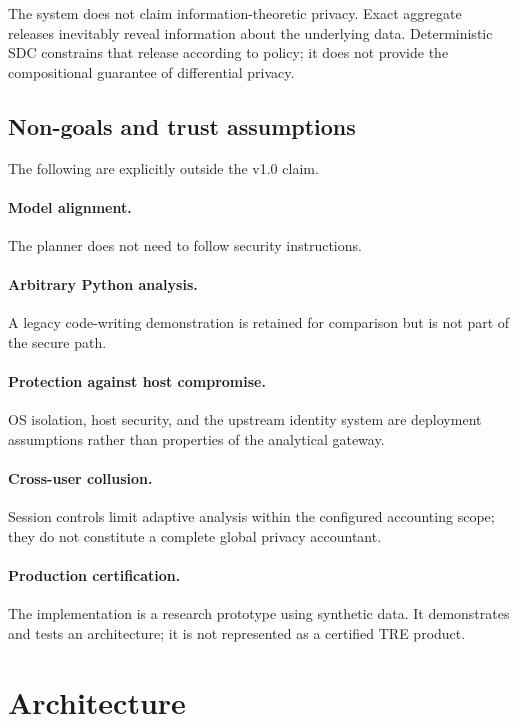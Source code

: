 \documentclass[11pt,a4paper]{article}
\begin{document}
The system does not claim information-theoretic privacy. Exact aggregate
releases inevitably reveal information about the underlying data. Deterministic
SDC constrains that release according to policy; it does not provide the
compositional guarantee of differential privacy.

\subsection{Non-goals and trust assumptions}

The following are explicitly outside the v1.0 claim.

\paragraph{Model alignment.} The planner does not need to follow security
instructions.

\paragraph{Arbitrary Python analysis.} A legacy code-writing demonstration is
retained for comparison but is not part of the secure path.

\paragraph{Protection against host compromise.} OS isolation, host security,
and the upstream identity system are deployment assumptions rather than
properties of the analytical gateway.

\paragraph{Cross-user collusion.} Session controls limit adaptive analysis
within the configured accounting scope; they do not constitute a complete
global privacy accountant.

\paragraph{Production certification.} The implementation is a research
prototype using synthetic data. It demonstrates and tests an architecture; it
is not represented as a certified TRE product.

\section{Architecture}
\label{sec:architecture}
\end{document}
